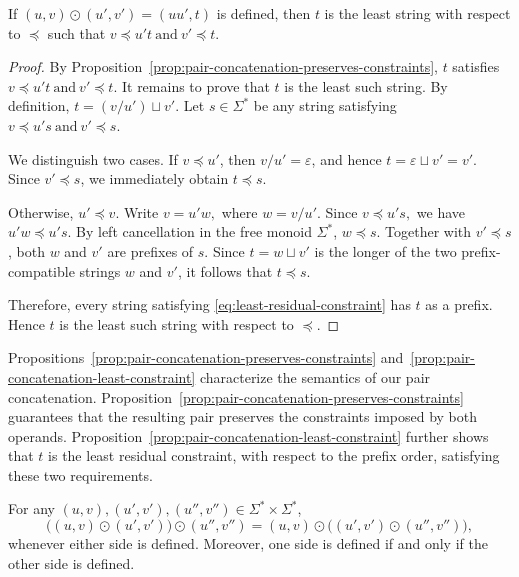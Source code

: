 \begin{proposition}
\label{prop:pair-concatenation-least-constraint}
If $(u,v)\odot(u',v')=(uu',t)$ is defined, then $t$ is the least string with respect to $\preceq$ such that $ v\preceq u't \:\text{and}\: v'\preceq t.$
\end{proposition}

\begin{proof}
By Proposition~\ref{prop:pair-concatenation-preserves-constraints}, $t$ satisfies $ v\preceq u't \: \text{and}\: v'\preceq t .$ It remains to prove that $t$ is the least such string. By definition, $t=(v/u')\sqcup v'.$ Let $s\in\Sigma^*$ be any string satisfying $v\preceq u's \:\text{and}\: v'\preceq s .$

We distinguish two cases. If $v\preceq u'$, then $v/u'=\varepsilon$, and hence $ t=\varepsilon\sqcup v'=v'. $ Since $v'\preceq s$, we immediately obtain $ t\preceq s. $ 

Otherwise, $u'\preceq v$. Write $ v=u'w, $ where $w=v/u'$. Since $ v\preceq u's, $ we have $ u'w\preceq u's. $ By left cancellation in the free monoid $\Sigma^*$, $w\preceq s.$ Together with $v'\preceq s$, both $w$ and $v'$ are prefixes of $s$. Since $ t=w\sqcup v'$ is the longer of the two prefix-compatible strings $w$ and $v'$, it follows that $ t\preceq s.$

Therefore, every string satisfying \eqref{eq:least-residual-constraint} has $t$ as a prefix. Hence $t$ is the least such string with respect to $\preceq$.
\end{proof}

\begin{remark}
Propositions~\ref{prop:pair-concatenation-preserves-constraints}
and~\ref{prop:pair-concatenation-least-constraint} characterize the
semantics of our pair concatenation. Proposition~\ref{prop:pair-concatenation-preserves-constraints}
guarantees that the resulting pair preserves the constraints imposed by both
operands. Proposition~\ref{prop:pair-concatenation-least-constraint}
further shows that $t$ is the least residual constraint, with respect
to the prefix order, satisfying these two requirements.

\end{remark}

\begin{proposition}
\label{prop:pair-concatenation-associative}
For any $(u,v),(u',v'),(u'',v'')\in\Sigma^*\times\Sigma^*$,
\begin{equation}
\bigl((u,v)\odot(u',v')\bigr)\odot(u'',v'')
=
(u,v)\odot\bigl((u',v')\odot(u'',v'')\bigr),
\label{eq:pair-concatenation-associative}
\end{equation}
whenever either side is defined. Moreover, one side is defined if and
only if the other side is defined.
\end{proposition}

